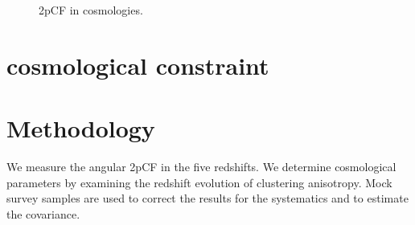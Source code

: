 \documentclass[iop]{emulateapj}
\begin{document}
\begin{figure}
   \caption{\label{fig_cosmo}
   2pCF in cosmologies.
   }
\end{figure}




\section{cosmological constraint}



\section{Methodology}\label{sec:methodology}

We measure the angular 2pCF in the five redshifts.
We determine cosmological parameters by examining the redshift evolution of clustering anisotropy.
Mock survey samples are used to correct the results for the systematics and to estimate the covariance.
\end{document}

